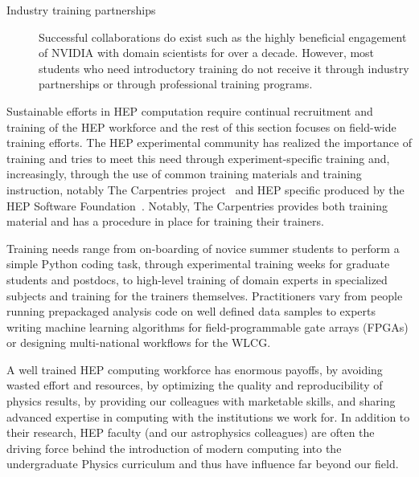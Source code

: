 \begin{description}
  \item [Industry training partnerships] Successful collaborations do exist such as the highly beneficial engagement of NVIDIA with domain scientists for over a decade.  However, most students who need introductory training do not receive it through industry partnerships or through professional training programs.   
\end{description}

\begin{comment}
    We need to make an effort to find the underlying challenges so that together we can address R\&D challenges in diverse teams. 
\end{comment}

Sustainable efforts in HEP computation require continual recruitment and training of  the HEP workforce and the rest of this section focuses on field-wide training efforts. The HEP experimental community has realized the importance of training and tries to meet this need through experiment-specific training and, increasingly, through the use of common training materials and training instruction, notably The Carpentries project~\cite{Carpentries} and HEP specific produced by the HEP Software Foundation~\cite{Malik_2021}.  Notably, The Carpentries provides both training material and has a procedure in place for training their trainers.

Training needs range from on-boarding of novice summer students to perform a simple Python coding task, through experimental training weeks for graduate students and postdocs, to high-level training of domain experts in specialized subjects and training for the trainers themselves. Practitioners vary from people running prepackaged analysis code on well defined data samples to experts writing machine learning algorithms for field-programmable gate arrays (FPGAs) or designing multi-national workflows for the WLCG.  

A well trained HEP computing workforce has enormous payoffs, by avoiding wasted effort and resources, by optimizing the quality and reproducibility of physics results, by providing our colleagues with marketable skills, and sharing advanced expertise in computing with the institutions we work for.  In addition to their research, HEP faculty (and our astrophysics colleagues) are often the driving force behind the introduction of  modern computing into the undergraduate Physics curriculum and thus have influence far beyond our field.  

